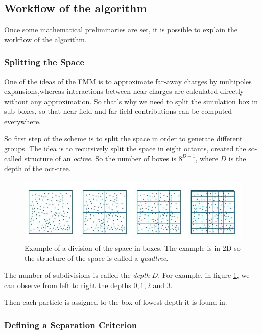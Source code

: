 \documentclass[12pt,twoside,a4paper]{report}
\begin{document}
	
	\subsection{Workflow of the algorithm}
	
	Once some mathematical preliminaries are set, it is possible to explain the workflow of the algorithm.
	
	\subsubsection{Splitting the Space}
	
	One of the ideas of the FMM is to approximate far-away charges by multipoles expansions,whereas interactions between near charges are calculated directly without any approximation. So that's why we need to split the simulation box in sub-boxes, so that near field and far field contributions can be computed everywhere. 	
	
	So first step of the scheme is to split the space in order to generate different groups. The idea is to recursively split the space in eight octants, created the so-called structure of an \textit{octree}. So the number of boxes is $8^{D-1}$, where $D$ is the depth of the oct-tree.
	
		
	
	\begin{figure}[H]
	    
    \includegraphics[scale=0.9]{BoxDepth}    
    \centering 
    \caption{Example of a division of the space in boxes. The  example is in 2D so the structure of the space is called a \textit{quadtree}.}
    \label{fig:depth}       
     \end{figure}
	
    
    The number of subdivisions is called the \textit{depth} $D$. For example, in figure \ref{fig:depth}, we can observe from left to right the depths $0,1,2$ and $3$.
    
    Then each particle is assigned  to the box of lowest depth it is found in.
    
	\subsubsection{Defining a Separation Criterion}
	
\end{document}
